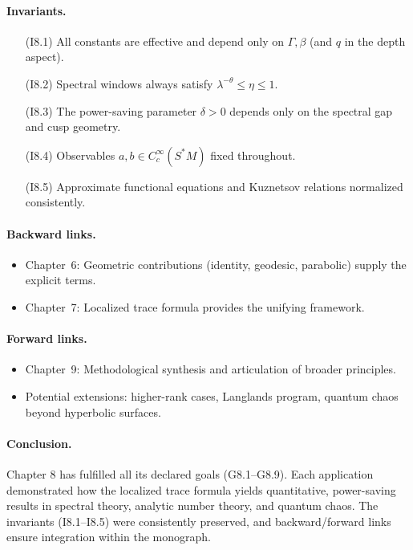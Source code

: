 \paragraph{Invariants.}
\begin{itemize}
\item[(I8.1)] All constants are effective and depend only on $\Gamma,\beta$ (and $q$ in the depth aspect).  
\item[(I8.2)] Spectral windows always satisfy $\lambda^{-\theta}\le \eta\le 1$.  
\item[(I8.3)] The power-saving parameter $\delta>0$ depends only on the spectral gap and cusp geometry.  
\item[(I8.4)] Observables $a,b\in C_c^\infty(S^*M)$ fixed throughout.  
\item[(I8.5)] Approximate functional equations and Kuznetsov relations normalized consistently.  
\end{itemize}

\paragraph{Backward links.}
\begin{itemize}
\item Chapter~6: Geometric contributions (identity, geodesic, parabolic) supply the explicit terms.  
\item Chapter~7: Localized trace formula provides the unifying framework.  
\end{itemize}

\paragraph{Forward links.}
\begin{itemize}
\item Chapter~9: Methodological synthesis and articulation of broader principles.  
\item Potential extensions: higher-rank cases, Langlands program, quantum chaos beyond hyperbolic surfaces.  
\end{itemize}

\paragraph{Conclusion.}
Chapter 8 has fulfilled all its declared goals (G8.1–G8.9). Each application demonstrated how the localized trace formula yields quantitative, power-saving results in spectral theory, analytic number theory, and quantum chaos. The invariants (I8.1–I8.5) were consistently preserved, and backward/forward links ensure integration within the monograph.  

